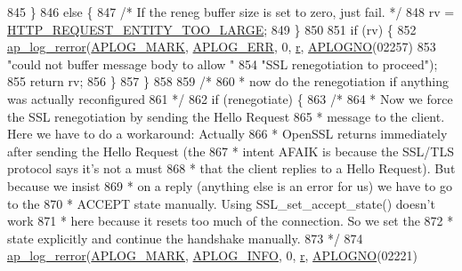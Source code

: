 \begin{DoxyCode}
{{845         \}
846         \textcolor{keywordflow}{else} \{
847             \textcolor{comment}{/* If the reneg buffer size is set to zero, just fail. */}
848             rv = \hyperlink{group__HTTP__Status_ga93fd8ea184f2b91b69c000f86d2e35bf}{HTTP\_REQUEST\_ENTITY\_TOO\_LARGE};
849         \}
850 
851         \textcolor{keywordflow}{if} (rv) \{
852             \hyperlink{group__APACHE__CORE__LOG_ga4c112558ccffd6b363da102b2052d2a6}{ap\_log\_rerror}(\hyperlink{group__APACHE__CORE__LOG_ga655e126996849bcb82e4e5a14c616f4a}{APLOG\_MARK}, \hyperlink{group__APACHE__CORE__LOG_ga57ad94ed8c92c4306de90479251a5d58}{APLOG\_ERR}, 0, 
      \hyperlink{group__APACHE__CORE__CONFIG_ga091cdd45984e865a888a4f8bb8fe107a}{r}, \hyperlink{group__APACHE__CORE__LOG_ga1dee8a07e06bc5b3de8b89662c2cd666}{APLOGNO}(02257)
853                           \textcolor{stringliteral}{"could not buffer message body to allow "}
854                           \textcolor{stringliteral}{"SSL renegotiation to proceed"});
855             \textcolor{keywordflow}{return} rv;
856         \}
857     \}
858 
859     \textcolor{comment}{/*}
860 \textcolor{comment}{     * now do the renegotiation if anything was actually reconfigured}
861 \textcolor{comment}{     */}
862     \textcolor{keywordflow}{if} (renegotiate) \{
863         \textcolor{comment}{/*}
864 \textcolor{comment}{         * Now we force the SSL renegotiation by sending the Hello Request}
865 \textcolor{comment}{         * message to the client. Here we have to do a workaround: Actually}
866 \textcolor{comment}{         * OpenSSL returns immediately after sending the Hello Request (the}
867 \textcolor{comment}{         * intent AFAIK is because the SSL/TLS protocol says it's not a must}
868 \textcolor{comment}{         * that the client replies to a Hello Request). But because we insist}
869 \textcolor{comment}{         * on a reply (anything else is an error for us) we have to go to the}
870 \textcolor{comment}{         * ACCEPT state manually. Using SSL\_set\_accept\_state() doesn't work}
871 \textcolor{comment}{         * here because it resets too much of the connection.  So we set the}
872 \textcolor{comment}{         * state explicitly and continue the handshake manually.}
873 \textcolor{comment}{         */}
874         \hyperlink{group__APACHE__CORE__LOG_ga4c112558ccffd6b363da102b2052d2a6}{ap\_log\_rerror}(\hyperlink{group__APACHE__CORE__LOG_ga655e126996849bcb82e4e5a14c616f4a}{APLOG\_MARK}, \hyperlink{group__APACHE__CORE__LOG_ga47fafbef7e478babdd92e90407f95b19}{APLOG\_INFO}, 0, 
      \hyperlink{group__APACHE__CORE__CONFIG_ga091cdd45984e865a888a4f8bb8fe107a}{r}, \hyperlink{group__APACHE__CORE__LOG_ga1dee8a07e06bc5b3de8b89662c2cd666}{APLOGNO}(02221)
}}
\end{DoxyCode}
